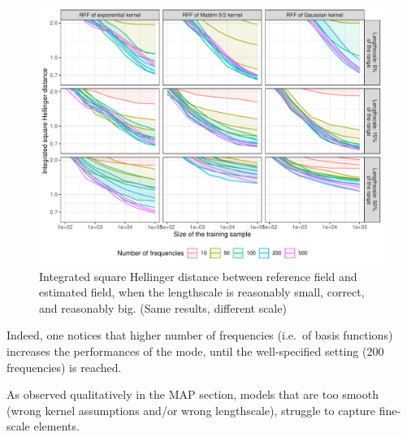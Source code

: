 \documentclass[
]{article}
\begin{document}
\begin{figure}[H]

{\centering \includegraphics{IntroductionSLGP_files/figure-latex/PlotOtherLen2-1} 

}

\caption{Integrated square Hellinger distance between reference field and estimated field, when the lengthscale is reasonably small, correct, and reasonably big. (Same results, different scale)}\label{fig:PlotOtherLen2}
\end{figure}

Indeed, one notices that higher number of frequencies (i.e.~of basis functions) increases the performances of the mode, until the well-specified setting (200 frequencies) is reached.

As observed qualitatively in the MAP section, models that are too smooth (wrong kernel assumptions and/or wrong lengthscale), struggle to capture fine-scale elements.

  
\end{document}
